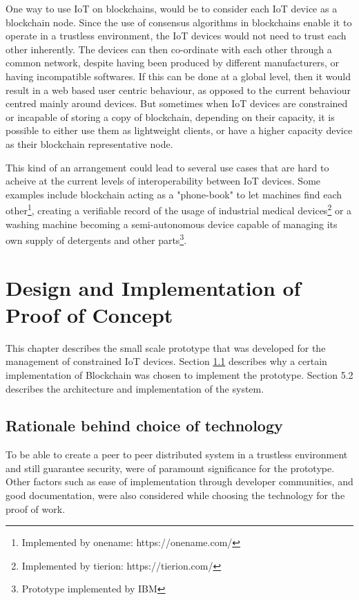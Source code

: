 \documentclass[english]{tktltiki}
\begin{document}
One way to use IoT on blockchains, would be to consider each IoT device as a blockchain node. Since the use of consensus algorithms in blockchains enable it to operate in a trustless environment, the IoT devices would not need to trust each other inherently. The devices can then co-ordinate with each other through a common network, despite having been produced by different manufacturers, or having incompatible softwares. If this can be done at a global level, then it would result in a web based user centric behaviour, as opposed to the current behaviour centred mainly around devices. But sometimes when IoT devices are constrained or incapable of storing a copy of blockchain, depending on their capacity, it is possible to either use them as lightweight clients, or have a higher capacity device as their blockchain representative node.

This kind of an arrangement could lead to several use cases that are hard to acheive at the current levels of interoperability between IoT devices. Some examples include blockchain acting as a "phone-book" to let machines find each other\footnote{Implemented by onename: https://onename.com/}, creating a verifiable record of the usage of industrial medical devices\footnote{Implemented by tierion: https://tierion.com/} or a washing machine becoming a semi-autonomous device capable of managing its own supply of detergents and other parts\footnote{Prototype implemented by IBM}.

 

\newpage
\section{Design and Implementation of Proof of Concept} 
\label{Section:Implementation}

This chapter describes the small scale prototype that was developed for the management of constrained IoT devices. Section \ref{Section: Rationale} describes why a certain implementation of Blockchain was chosen to implement the prototype. Section 5.2 describes the architecture and implementation of the system.

\subsection{Rationale behind choice of technology} \label{Section: Rationale}
To be able to create a peer to peer distributed system in a trustless environment and still guarantee security, were of paramount significance for the prototype. Other factors such as ease of implementation through developer communities, and good documentation, were also considered while choosing the technology for the proof of work. 
\end{document}
